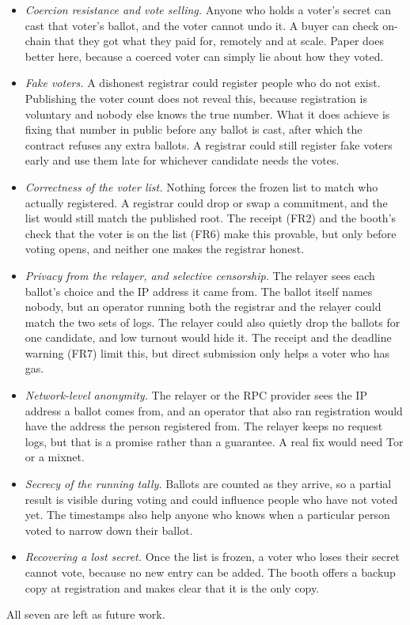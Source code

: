 \begin{itemize}
  \item \emph{Coercion resistance and vote selling.} Anyone who holds a voter's
        secret can cast that voter's ballot, and the voter cannot undo it. A
        buyer can check on-chain that they got what they paid for, remotely and
        at scale. Paper does better here, because a coerced voter can simply
        lie about how they voted.
  \item \emph{Fake voters.} A dishonest registrar could register people who do
        not exist. Publishing the voter count does not reveal this, because
        registration is voluntary and nobody else knows the true number. What
        it does achieve is fixing that number in public before any ballot is
        cast, after which the contract refuses any extra ballots. A registrar
        could still register fake voters early and use them late for whichever
        candidate needs the votes.
  \item \emph{Correctness of the voter list.} Nothing forces the frozen list to
        match who actually registered. A registrar could drop or swap a
        commitment, and the list would still match the published root. The
        receipt (FR2) and the booth's check that the voter is on the list (FR6)
        make this provable, but only before voting opens, and neither one makes
        the registrar honest.
  \item \emph{Privacy from the relayer, and selective censorship.} The relayer
        sees each ballot's choice and the IP address it came from. The ballot
        itself names nobody, but an operator running both the registrar and
        the relayer could match the two sets of logs. The relayer could also
        quietly drop the ballots for one candidate, and low turnout would hide
        it. The receipt and the deadline warning (FR7) limit this, but direct
        submission only helps a voter who has gas.
  \item \emph{Network-level anonymity.} The relayer or the RPC provider sees the
        IP address a ballot comes from, and an operator that also ran
        registration would have the address the person registered from. The
        relayer keeps no request logs, but that is a promise rather than a
        guarantee. A real fix would need Tor or a mixnet.
  \item \emph{Secrecy of the running tally.} Ballots are counted as they arrive,
        so a partial result is visible during voting and could influence people
        who have not voted yet. The timestamps also help anyone who knows when
        a particular person voted to narrow down their ballot.
  \item \emph{Recovering a lost secret.} Once the list is frozen, a voter who
        loses their secret cannot vote, because no new entry can be added. The
        booth offers a backup copy at registration and makes clear that it is
        the only copy.
\end{itemize}

All seven are left as future work.
